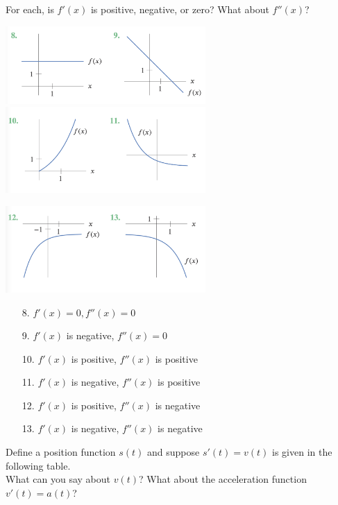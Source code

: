 \documentclass[11pt]{exam}
\begin{document}
\vspace{.5em}
\begin{questions}
  \question For each, is $f'(x)$ is positive, negative, or zero? What about $f''(x)$?

    \includegraphics[width=3in]{graphs1}
    \includegraphics[width=3in]{graphs2}

    \includegraphics[width=3in]{graphs3}
\begin{solution}
  \begin{enumerate}
  \item[8.]  \(f'(x) = 0, f''(x) = 0\)
  \item[9.] \(f'(x)\) is negative, \(f''(x) = 0\)
  \item[10.] \(f'(x)\) is positive, \(f''(x)\) is positive
  \item[11.] \(f'(x)\) is negative, \(f''(x)\) is positive
  \item[12.] \(f'(x)\) is positive, \(f''(x)\) is negative
  \item[13.] \(f'(x)\) is negative, \(f''(x)\) is negative
  \end{enumerate}
\end{solution}
\question Define a position function $s(t)$ and suppose $s'(t)=v(t)$ is given in the following table.\\
\hspace*{.4cm}  What can you say about $v(t)$?  What about the acceleration function $v'(t)=a(t)$?


\end{questions}
\end{document}
